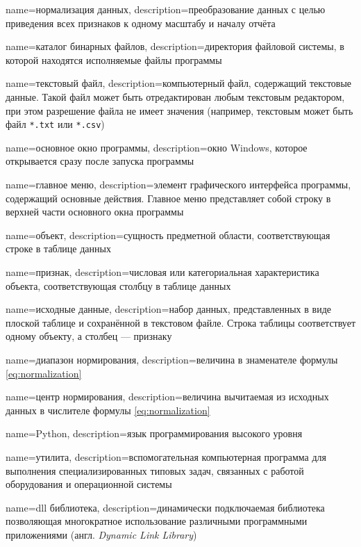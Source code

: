 {
	name=нормализация данных,
	description={преобразование данных с целью приведения всех признаков к одному масштабу и началу отчёта}
}

{
	name=каталог бинарных файлов,
	description={директория файловой системы, в которой находятся исполняемые файлы программы}
}

{
	name=текстовый файл,
	description={компьютерный файл, содержащий текстовые данные. Такой файл может быть отредактирован любым текстовым редактором, при этом разрешение файла не имеет значения (например, текстовым может быть файл \texttt{*.txt} или \texttt{*.csv}) }
}

{
	name=основное окно программы,
	description={окно Windows, которое открывается сразу после запуска программы}
}

{
	name=главное меню,
	description={элемент графического интерфейса программы, содержащий основные действия. Главное меню представляет собой строку в верхней части основного окна программы}
}

{
	name=объект,
	description={сущность предметной области, соответствующая строке в таблице данных}
}


{
	name=признак,
	description={числовая или категориальная характеристика объекта, соответствующая столбцу в таблице данных}
}


{
	name=исходные данные,
	description={набор данных, представленных в виде плоской таблице и сохранённой в текстовом файле. Строка таблицы соответствует одному объекту, а столбец --- признаку}
}

{
	name=диапазон нормирования,
	description={величина в знаменателе формулы \ref{eq:normalization}}
}

{
	name=центр нормирования,
	description={величина вычитаемая из исходных данных в числителе формулы \ref{eq:normalization}}
}

{
	name=Python,
	description={язык программирования высокого уровня}
}


{
	name=утилита,
	description={вспомогательная компьютерная программа для выполнения специализированных типовых задач, связанных с работой оборудования и операционной системы}
}

{
	name=dll библиотека,
	description={динамически подключаемая библиотека позволяющая многократное использование различными программными приложениями (англ. \textit{Dynamic Link Library})}
}

